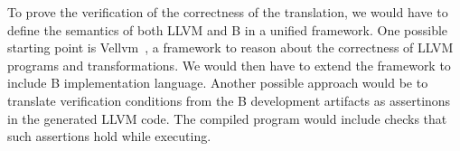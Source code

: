 \documentclass{llncs}
\begin{document}
To prove the verification of the correctness of the translation, we would have
to define the semantics of both LLVM and B in a unified framework. One possible
starting point is Vellvm~\cite{vellvm}, a framework to reason about the
correctness of LLVM programs and transformations. We would then have to extend
the framework to include B implementation language. Another possible approach
would be to translate verification conditions from the B development artifacts
as assertinons in the generated LLVM code. The compiled program would include
checks that such assertions hold while executing.



\end{document}
